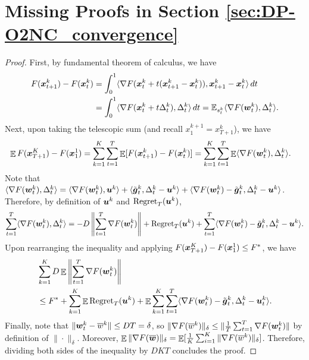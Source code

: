 \section{Missing Proofs in Section \ref{sec:DP-O2NC_convergence}}
\label{app:DP-O2NC:base-lemma}


\begin{proof}
First, by fundamental theorem of calculus, we have
\begin{align*}
    F({\boldsymbol{x}}_{t+1}^k) - F({\boldsymbol{x}}_t^k)
    &= \int_0^1 \langle \nabla F({\boldsymbol{x}}_t^k + t({\boldsymbol{x}}_{t+1}^k-{\boldsymbol{x}}_t^k)), {\boldsymbol{x}}_{t+1}^k-{\boldsymbol{x}}_t^k\rangle \, dt \\
    &= \int_0^1 \langle \nabla F({\boldsymbol{x}}_t^k+t\Delta_t^k), \Delta_t^k\rangle \, dt
    = \mathbb{E}_{s_t^k} \langle \nabla F({\boldsymbol{w}}_t^k), \Delta_t^k\rangle. 
\end{align*}
Next, upon taking the telescopic sum (and recall $x_1^{k+1} = x_{T+1}^k$), we have
\begin{align*}
    \mathop{\mathbb{E}} F({\boldsymbol{x}}_{T+1}^K) - F({\boldsymbol{x}}_1^1)
    &= \sum_{k=1}^K\sum_{t=1}^T \mathop{\mathbb{E}}[ F({\boldsymbol{x}}_{t+1}^k) - F({\boldsymbol{x}}_t^k) ] 
    = \sum_{k=1}^K\sum_{t=1}^T \mathop{\mathbb{E}}\langle \nabla F({\boldsymbol{w}}_t^k), \Delta_t^k \rangle.
\end{align*}
Note that $\langle \nabla F({\boldsymbol{w}}_t^k), \Delta_t^k \rangle = \langle \nabla F({\boldsymbol{w}}_t^k), {\boldsymbol{u}}^k \rangle + \langle \tilde{{\boldsymbol{g}}}_t^k, \Delta_t^k-{\boldsymbol{u}}^k \rangle + \langle \nabla F({\boldsymbol{w}}_t^k) - \tilde {{\boldsymbol{g}}}_t^k, \Delta_t^k - {\boldsymbol{u}}^k \rangle$. Therefore, by definition of ${\boldsymbol{u}}^k$ and $\mathrm{Regret}_T({\boldsymbol{u}}^k)$,
\begin{equation*}
    \sum_{t=1}^T\langle \nabla F({\boldsymbol{w}}_t^k), \Delta_t^k \rangle
    = -D\left\|\sum_{t=1}^T \nabla F({\boldsymbol{w}}_t^k) \right\| + \mathrm{Regret}_T({\boldsymbol{u}}^k) + \sum_{t=1}^T \langle \nabla F({\boldsymbol{w}}_t^k)-\tilde{{\boldsymbol{g}}}_t^k, \Delta_t^k-{\boldsymbol{u}}^k \rangle.
\end{equation*}
Upon rearranging the inequality and applying $F({\boldsymbol{x}}_{T+1}^K)-F({\boldsymbol{x}}_1^1)\le F^*$, we have
\begin{align*}
    &\sum_{k=1}^K D\mathop{\mathbb{E}}\left\|\sum_{t=1}^T\nabla F({\boldsymbol{w}}_t^k)\right\| \\
    &\le F^* + \sum_{k=1}^K \mathop{\mathbb{E}}\mathrm{Regret}_T({\boldsymbol{u}}^k) + \mathop{\mathbb{E}}\sum_{k=1}^K\sum_{t=1}^T \langle \nabla F({\boldsymbol{w}}_t^k)-\tilde{{\boldsymbol{g}}}_t^k, \Delta_t^k-{\boldsymbol{u}}_t^k \rangle.
\end{align*}
Finally, note that $\|{\boldsymbol{w}}_t^k-\overline w^k\| \le DT = \delta$, so $\|\nabla F(\overline w^k)\|_\delta \le \|\frac{1}{T}\sum_{t=1}^T \nabla F({\boldsymbol{w}}_t^k)\|$ by definition of $\|\cdot\|_\delta$. Moreover, $\mathop{\mathbb{E}}\|\nabla F(\overline{{\boldsymbol{w}}})\|_\delta = \mathop{\mathbb{E}}[\frac{1}{K}\sum_{i=1}^K\|\nabla F(\overline w^k)\|_\delta]$. Therefore, dividing both sides of the inequality by $DKT$ concludes the proof.
\end{proof}


